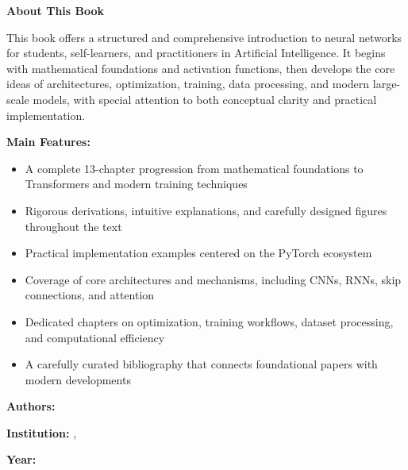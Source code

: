 \newpage
\thispagestyle{empty}

\vspace*{2cm}

\begin{center}
    \Large\textbf{About This Book}
\end{center}

\vspace{1cm}

This book offers a structured and comprehensive introduction to neural networks for students, self-learners, and practitioners in Artificial Intelligence. It begins with mathematical foundations and activation functions, then develops the core ideas of architectures, optimization, training, data processing, and modern large-scale models, with special attention to both conceptual clarity and practical implementation.

\textbf{Main Features:}
\begin{itemize}
    \item A complete 13-chapter progression from mathematical foundations to Transformers and modern training techniques
    \item Rigorous derivations, intuitive explanations, and carefully designed figures throughout the text
    \item Practical implementation examples centered on the PyTorch ecosystem
    \item Coverage of core architectures and mechanisms, including CNNs, RNNs, skip connections, and attention
    \item Dedicated chapters on optimization, training workflows, dataset processing, and computational efficiency
    \item A carefully curated bibliography that connects foundational papers with modern developments
\end{itemize}

\vspace{2cm}

\textbf{Authors:} \thesisAuthor

\textbf{Institution:} \thesisSchool, \thesisDepartment

\textbf{Year:} \thesisYear

\newpage
